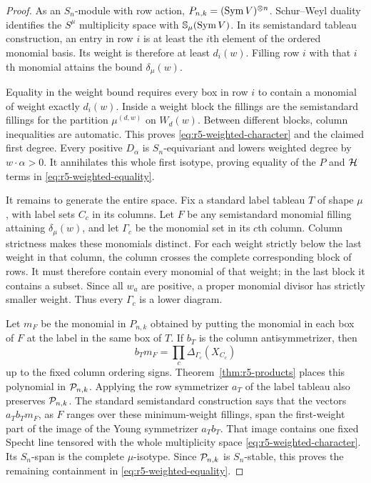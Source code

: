 \begin{proof}
As an $S_n$-module with row action,
$P_{n,k}=(\operatorname{Sym} V)^{\otimes n}$.  Schur--Weyl duality identifies
the $S^\mu$ multiplicity space with $\mathbb S_\mu(\operatorname{Sym} V)$.
In its semistandard tableau construction, an entry in row $i$ is
at least the $i$th element of the ordered monomial basis.  Its
weight is therefore at least $d_i(w)$.  Filling row $i$ with that
$i$th monomial attains the bound $\delta_\mu(w)$.

Equality in the weight bound requires every box in row $i$ to
contain a monomial of weight exactly $d_i(w)$.  Inside a weight
block the fillings are the semistandard fillings for the partition
$\mu^{(d,w)}$ on $W_d(w)$.  Between different blocks, column
inequalities are automatic.  This proves
\eqref{eq:r5-weighted-character} and the claimed first degree.
Every positive $D_\alpha$ is $S_n$-equivariant and lowers weighted
degree by $w\cdot\alpha>0$.  It annihilates this whole first
isotype, proving equality of the $P$ and $\mathcal H$ terms in
\eqref{eq:r5-weighted-equality}.

It remains to generate the entire space.  Fix a standard label
tableau $T$ of shape $\mu$, with label sets $C_c$ in its columns.
Let $F$ be any semistandard monomial filling attaining
$\delta_\mu(w)$, and let $\Gamma_c$ be the monomial set in its
$c$th column.  Column strictness makes these monomials distinct.
For each weight strictly below the last weight in that column,
the column crosses the complete corresponding block of rows.
It must therefore contain every monomial of that weight; in the
last block it contains a subset.  Since all $w_a$ are positive,
a proper monomial divisor has strictly smaller weight.  Thus
every $\Gamma_c$ is a lower diagram.

Let $m_F$ be the monomial in $P_{n,k}$ obtained by putting the
monomial in each box of $F$ at the label in the same box of $T$.
If $b_T$ is the column antisymmetrizer, then
\[
                     b_Tm_F
                       =\prod_c\Delta_{\Gamma_c}(X_{C_c})
\]
up to the fixed column ordering signs.  Theorem~\ref{thm:r5-products}
places this polynomial in $\mathcal P_{n,k}$.  Applying the row
symmetrizer $a_T$ of the label tableau also preserves $\mathcal P_{n,k}$.
The standard
semistandard construction says that the vectors $a_Tb_Tm_F$, as
$F$ ranges over these minimum-weight fillings, span the
first-weight part of the image of the Young symmetrizer $a_Tb_T$.
That image contains one fixed Specht line tensored with the whole
multiplicity space \eqref{eq:r5-weighted-character}.
Its $S_n$-span is the complete $\mu$-isotype.  Since $\mathcal P_{n,k}$
is $S_n$-stable, this proves the remaining containment in
\eqref{eq:r5-weighted-equality}.
\end{proof}

